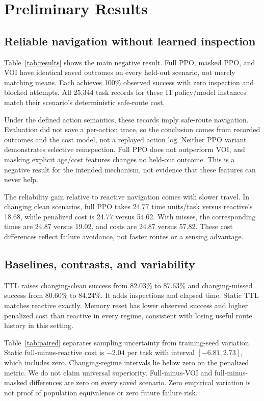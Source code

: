 \documentclass[journal]{IEEEtai}
\begin{document}
\section{Preliminary Results}




\subsection{Reliable navigation without learned inspection}
Table~\ref{tab:results} shows the main negative result. Full PPO, masked PPO, and VOI have identical saved outcomes on every held-out scenario, not merely matching means. Each achieves 100\% observed success with zero inspection and blocked attempts. All 25,344 task records for these 11 policy/model instances match their scenario's deterministic safe-route cost.

Under the defined action semantics, these records imply safe-route navigation. Evaluation did not save a per-action trace, so the conclusion comes from recorded outcomes and the cost model, not a replayed action log. Neither PPO variant demonstrates selective reinspection. Full PPO does not outperform VOI, and masking explicit age/cost features changes no held-out outcome. This is a negative result for the intended mechanism, not evidence that these features can never help.

The reliability gain relative to reactive navigation comes with slower travel. In changing clean scenarios, full PPO takes 24.77 time units/task versus reactive's 18.68, while penalized cost is 24.77 versus 54.62. With misses, the corresponding times are 24.87 versus 19.02, and costs are 24.87 versus 57.82. These cost differences reflect failure avoidance, not faster routes or a sensing advantage.

\subsection{Baselines, contrasts, and variability}
TTL raises changing-clean success from 82.03\% to 87.63\% and changing-missed success from 80.60\% to 84.24\%. It adds inspections and elapsed time. Static TTL matches reactive exactly. Memory reset has lower observed success and higher penalized cost than reactive in every regime, consistent with losing useful route history in this setting.

Table~\ref{tab:paired} separates sampling uncertainty from training-seed variation. Static full-minus-reactive cost is $-2.04$ per task with interval $[-6.81,2.73]$, which includes zero. Changing-regime intervals lie below zero on the penalized metric. We do not claim universal superiority. Full-minus-VOI and full-minus-masked differences are zero on every saved scenario. Zero empirical variation is not proof of population equivalence or zero future failure risk.
\end{document}
